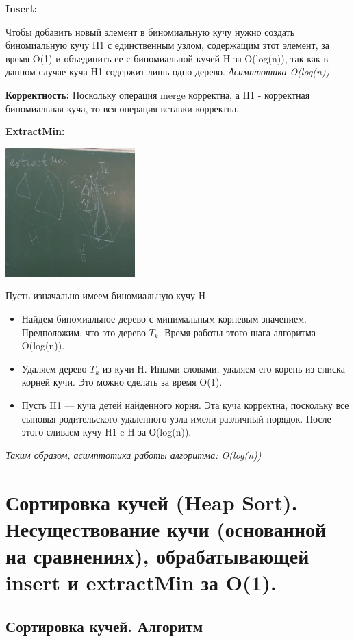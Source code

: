 \textbf{Insert:}

Чтобы добавить новый элемент в биномиальную кучу нужно создать биномиальную кучу H1 с единственным узлом, содержащим этот элемент, за время O(1) и объединить ее с биномиальной кучей H за O(log(n)), так как в данном случае куча H1 содержит лишь одно дерево. \textit{Асимптотика O(log(n))}

 \textbf{Корректность:} Поскольку операция merge корректна, а H1 - корректная биномиальная куча, то вся операция вставки корректна.

\textbf{ExtractMin:
}

\includegraphics[width = 5cm]{images/27_3}

Пусть изначально имеем биномиальную кучу H
\begin{itemize}
\item Найдем биномиальное дерево с минимальным корневым значением. Предположим, что это дерево $T_k$. Время работы этого шага алгоритма O(log(n)).
\item Удаляем дерево $T_k$ из кучи H. Иными словами, удаляем его корень из списка корней кучи. Это можно сделать за время O(1).

\item Пусть H1 — куча детей найденного корня. Эта куча корректна, поскольку все сыновья родительского удаленного узла имели различный порядок. После этого сливаем кучу H1 c H за О(log(n)).
\end{itemize}
\textit{Таким образом, асимптотика работы алгоритма: O(log(n))}

\section{Сортировка кучей (Heap Sort). Несуществование кучи (основанной на сравнениях), обрабатывающей insert и extractMin за O(1).}

\subsection*{Сортировка кучей. Алгоритм}

